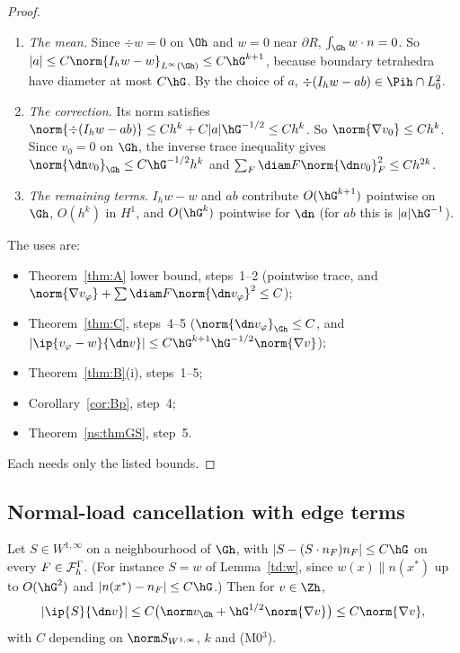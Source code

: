 \begin{proof}
\begin{enumerate}
\item \emph{The mean.} Since $\div w=0$ on $\Oh$ and $w=0$ near $\partial R$, $\int_{\Gh}w\cdot n=0$. So $|a|\le C\norm{I_hw-w}_{L^\infty(\Gh)}\le C\hG^{k+1}$, because boundary tetrahedra have diameter at most $C\hG$. By the choice of $a$, $\div(I_hw-ab)\in\Pih\cap L^2_0$.
\item \emph{The correction.} Its norm satisfies $\norm{\div(I_hw-ab)}\le Ch^k+C|a|\hG^{-1/2}\le Ch^k$. So $\norm{\nabla v_0}\le Ch^k$. Since $v_0=0$ on $\Gh$, the inverse trace inequality gives $\norm{\dn v_0}_{\Gh}\le C\hG^{-1/2}h^k$ and $\sum_F\diam F\norm{\dn v_0}^2_F\le Ch^{2k}$.
\item \emph{The remaining terms.} $I_hw-w$ and $ab$ contribute $O(\hG^{k+1})$ pointwise on $\Gh$, $O(h^k)$ in $H^1$, and $O(\hG^k)$ pointwise for $\dn$ (for $ab$ this is $|a|\hG^{-1}$).
\end{enumerate}
The uses are:
\begin{itemize}
\item Theorem~\ref{thm:A} lower bound, steps~1--2 (pointwise trace, and $\norm{\nabla v_\varphi}+\sum\diam F\norm{\dn v_\varphi}^2\le C$);
\item Theorem~\ref{thm:C}, steps~4--5 ($\norm{\dn v_\varphi}_{\Gh}\le C$, and $|\ip{v_\varphi-w}{\dn v}|\le C\hG^{k+1}\hG^{-1/2}\norm{\nabla v}$);
\item Theorem~\ref{thm:B}(i), steps~1--5;
\item Corollary~\ref{cor:Bp}, step~4;
\item Theorem~\ref{ns:thmGS}, step~5.
\end{itemize}
Each needs only the listed bounds.
\end{proof}

\subsection{Normal-load cancellation with edge terms}

\begin{lemma}\label{td:cancel}
Let $S\in W^{1,\infty}$ on a neighbourhood of $\Gh$, with $|S-(S\cdot n_F)n_F|\le C\hG$ on every $F\in\mathcal F_h^\Gamma$. (For instance $S=w$ of Lemma~\ref{td:w}, since $w(x)\parallel n(x^\ast)$ up to $O(\hG^2)$ and $|n(x^\ast)-n_F|\le C\hG$.) Then for $v\in\Zh$,
\[
|\ip{S}{\dn v}|\le C\bigl(\norm v_{\Gh}+\hG^{1/2}\norm{\nabla v}\bigr)\le C\norm{\nabla v},
\]
with $C$ depending on $\norm S_{W^{1,\infty}}$, $k$ and (M0$^3$).
\end{lemma}

